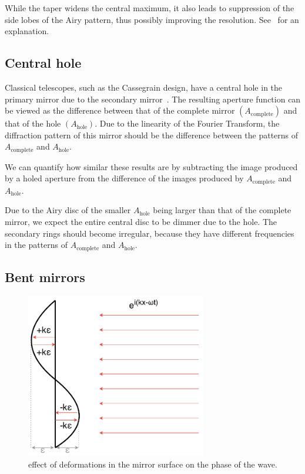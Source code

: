 \documentclass[11pt]{article}
\newcommand{\R}[1]{\mathrm{#1}}
\begin{document}
While the taper widens the central maximum, it also leads to suppression of the side lobes of the Airy pattern, thus possibly improving the resolution. See~\cite[Section~11.3]{hecht} for an explanation.

\subsection{Central hole}\label{sec:analysis:hole}
Classical telescopes, such as the Cassegrain design, have a central hole in the primary mirror due to the secondary mirror~\cite[Section~7.2.3]{RadioAstro}. The resulting aperture function can be viewed as the difference between that of the complete mirror $(A_{\R{complete}})$ and that of the hole $(A_{\R{hole}})$. Due to the linearity of the Fourier Transform, the diffraction pattern of this mirror should be the difference between the patterns of $A_{\R{complete}}$ and $A_{\R{hole}}$.

We can quantify how similar these results are by subtracting the image produced by a holed aperture from the difference of the images produced by $A_{\R{complete}}$ and $A_{\R{hole}}$.

Due to the Airy disc of the smaller $A_{\R{hole}}$ being larger than that of the complete mirror, we expect the entire central disc to be dimmer due to the hole. The secondary rings should become irregular, because they have different frequencies in the patterns of $A_{\R{complete}}$ and $A_{\R{hole}}$.

\subsection{Bent mirrors}\label{sec:analysis:bent}
\begin{figure}
    \centering
    \begin{minipage}{0.5\textwidth}
        \centering
        \includegraphics[width=0.7\textwidth]{pictures/mirror_dent.pdf}
    \end{minipage}%
    \hfill
    \begin{minipage}{0.4\textwidth}
        \caption{effect of deformations in the mirror surface on the phase of the wave.}\label{fig:bend}
    \end{minipage}
\end{figure}
\end{document}
